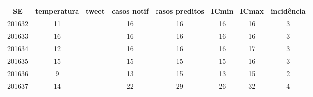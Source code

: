 \begin{tabular}{c|ccccccc}
  \hline
SE & temperatura & tweet & casos notif & casos preditos & ICmin & ICmax & incidência \\ 
  \hline
201632 & 11 &  & 16 & 16 & 16 & 16 & 3 \\ 
  201633 & 16 &  & 16 & 16 & 16 & 16 & 3 \\ 
  201634 & 12 &  & 16 & 16 & 16 & 17 & 3 \\ 
  201635 & 15 &  & 15 & 15 & 15 & 16 & 3 \\ 
  201636 & 9 &  & 13 & 15 & 13 & 15 & 2 \\ 
  201637 & 14 &  & 22 & 29 & 26 & 32 & 4 \\ 
   \hline
\end{tabular}
